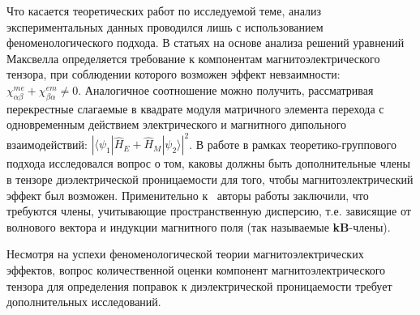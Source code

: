 Что касается теоретических работ по исследуемой теме, анализ экспериментальных данных проводился лишь с использованием феноменологического подхода. В статьях \cite{Bordacs2012, Kezsmarki2014, Miyahara2014} на основе анализа решений уравнений Максвелла определяется требование к компонентам магнитоэлектрического тензора, при соблюдении которого возможен эффект невзаимности: \(\chi^{me}_{\alpha\beta}+\chi^{em}_{\beta\alpha}\neq0\). Аналогичное соотношение можно получить, рассматривая перекрестные слагаемые в квадрате модуля матричного элемента перехода с одновременным действием электрического и магнитного дипольного взаимодействий: \( \left| \langle \psi_1 | \hat{H}_E + \hat{H}_M | \psi_2 \rangle \right| ^2\). В работе \cite{Nikitchenko2021} в рамках теоретико-группового подхода исследовался вопрос о том, каковы должны быть дополнительные члены в тензоре диэлектрической проницаемости для того, чтобы магнитоэлектрический эффект был возможен. Применительно к \cbo\ авторы работы \cite{Nikitchenko2021} заключили, что требуются члены, учитывающие пространственную дисперсию, т.е. зависящие от волнового вектора и индукции магнитного поля (так называемые \textbf{kB}-члены). 

Несмотря на успехи феноменологической теории магнитоэлектрических эффектов, вопрос количественной оценки компонент магнитоэлектрического тензора для определения поправок к диэлектрической проницаемости требует дополнительных исследований.

\FloatBarrier

